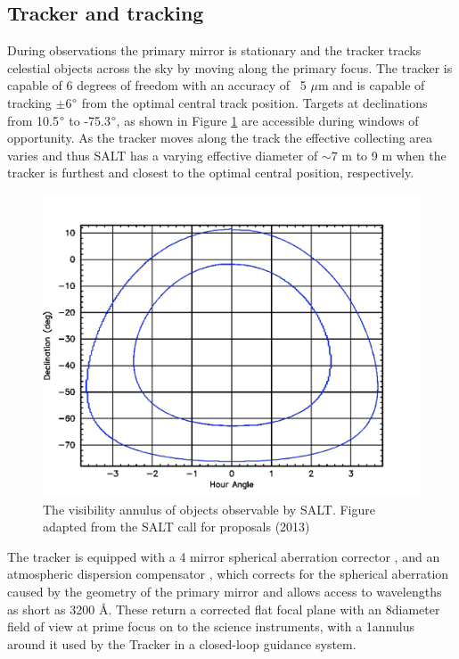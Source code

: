 \subsection{Tracker and tracking}

During observations the primary mirror is stationary and the tracker tracks celestial objects across the sky by moving along the primary focus. The tracker is capable of 6 degrees of freedom with an accuracy of ~5 $\mu$m and is capable of tracking $\pm$6$\degree$ from the optimal central track position. Targets at declinations from 10.5$\degree$ to -75.3$\degree$, as shown in Figure \ref{fig:SALT_visibility} are accessible during windows of opportunity. As the tracker moves along the track the effective collecting area varies and thus SALT has a varying effective diameter of $\sim7$ m to 9 m when the tracker is furthest and closest to the optimal central position, respectively.
\prgph

\begin{figure}[t]
    \centering
    \includegraphics[width = 13cm]{figures/2_SALT_visibility.png}
    \caption{The visibility annulus of objects observable by SALT. Figure adapted from the SALT call for proposals (2013)\protect\footnotemark}
    \label{fig:SALT_visibility}
\end{figure}


The tracker is equipped with a 4 mirror spherical aberration corrector \citep{SALT_SAC}, and an atmospheric dispersion compensator \citep{SALT_ADC}, which corrects for the spherical aberration caused by the geometry of the primary mirror and allows access to wavelengths as short as 3200 \AA. These return a corrected flat focal plane with an 8\arcmin diameter field of view at prime focus on to the science instruments, with a 1\arcmin annulus around it used by the Tracker in a closed-loop guidance system.
\prgph

